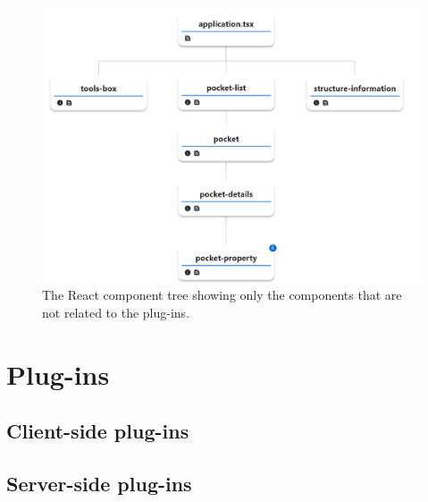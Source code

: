 \begin{figure}[htb]
    \centering
    \includegraphics[width=\textwidth]{img/react_molstar.pdf}
    \caption{The React component tree showing only the components that are not related to the plug-ins.}
    \label{fig:react-molstar}
\end{figure}

\section{Plug-ins}
\label{sec:plugins}


\subsection{Client-side plug-ins}

\subsection{Server-side plug-ins}